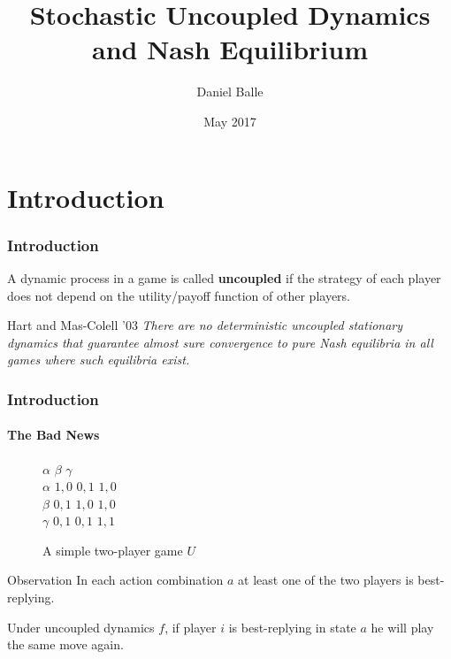 \documentclass{beamer}
\title{Stochastic Uncoupled Dynamics\\and Nash Equilibrium}
\author{Daniel Balle}
\institute{ETH Z\"{u}rich}
\date{May 2017}
\begin{document}
\beamertemplatenavigationsymbolsempty
 
\frame{\titlepage}
 
\section{Introduction}

\begin{frame}
    \frametitle{Introduction}
	\begin{definition}[Uncoupledness]
        A dynamic process in a game is called \textbf{uncoupled}
        if the strategy of each player does not depend on the
        utility/payoff function of other players.
    \end{definition}
    \pause
    \begin{alertblock}{Hart and Mas-Colell '03}
        \it There are no deterministic uncoupled stationary dynamics that guarantee almost sure
        convergence to pure Nash equilibria in all games where such equilibria exist.
    \end{alertblock}
\end{frame}
    
\begin{frame}
    \frametitle{Introduction}
    \framesubtitle{The Bad News}
    \vspace{-20pt}
    \begin{figure}[h]
    \centering
    \begin{game}{3}{3}
            \>  $\alpha$ \>  $\beta$  \> $\gamma$ \\
         $\alpha$    \>  $1, 0$ \> $0, 1$ \> $1,0$\\
         $\beta$      \>  $0, 1$ \> $1, 0$ \> $1, 0$\\
         $\gamma$ \>  $0, 1$ \> $0, 1$ \> $1, 1$\\
    \end{game}
    \caption{A simple two-player game $U$}
    \end{figure}
    \vspace{-10pt}
    \begin{exampleblock}{Observation}
        In each action combination $a$ at least one of the two players is best-replying.
    \end{exampleblock}
    \pause
    \begin{lemma}
        Under uncoupled dynamics $f$, if player $i$ is best-replying in state $a$ he will play the same move again.
    \end{lemma}
\end{frame}
\end{document}
